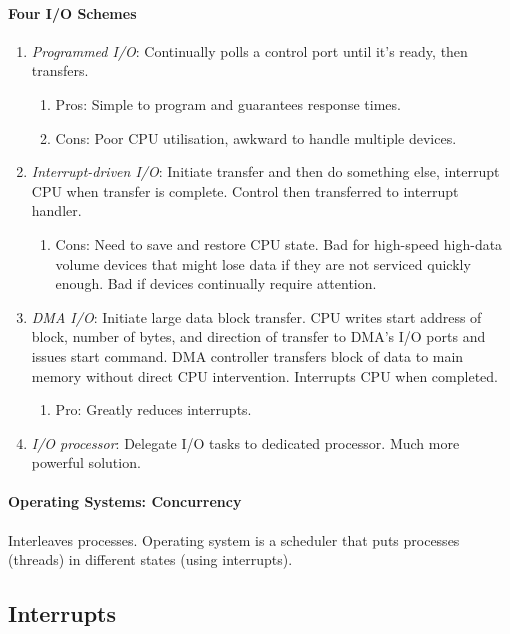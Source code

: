 \documentclass[twocolumn,english]{article}
\begin{document}
\paragraph{Four I/O Schemes}
\begin{enumerate}
\item \emph{Programmed I/O}: Continually polls a control port until it's
ready, then transfers.

\begin{enumerate}
\item Pros: Simple to program and guarantees response times.
\item Cons: Poor CPU utilisation, awkward to handle multiple devices.
\end{enumerate}
\item \emph{Interrupt-driven I/O}: Initiate transfer and then do something
else, interrupt CPU when transfer is complete. Control then transferred
to interrupt handler.

\begin{enumerate}
\item Cons: Need to save and restore CPU state. Bad for high-speed high-data
volume devices that might lose data if they are not serviced quickly
enough. Bad if devices continually require attention.
\end{enumerate}
\item \emph{DMA I/O}: Initiate large data block transfer. CPU writes start
address of block, number of bytes, and direction of transfer to DMA's
I/O ports and issues start command. DMA controller transfers block
of data to main memory without direct CPU intervention. Interrupts
CPU when completed.

\begin{enumerate}
\item Pro: Greatly reduces interrupts.
\end{enumerate}
\item \emph{I/O processor}: Delegate I/O tasks to dedicated processor. Much
more powerful solution.
\end{enumerate}

\paragraph{Operating Systems: Concurrency}

Interleaves processes. Operating system is a scheduler that puts processes
(threads) in different states (using interrupts).


\subsection{Interrupts}
\end{document}
